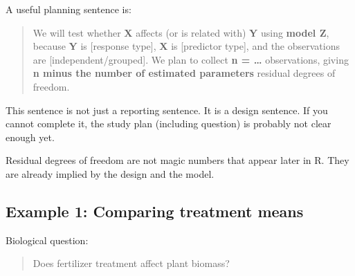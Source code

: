 \documentclass[
  letterpaper,
  8pt,
  a4paper]{book}
\begin{document}
A useful planning sentence is:

\begin{quote}
We will test whether \textbf{X} affects (or is related with) \textbf{Y}
using \textbf{model Z}, because \textbf{Y} is {[}response type{]},
\textbf{X} is {[}predictor type{]}, and the observations are
{[}independent/grouped{]}. We plan to collect \textbf{n = \ldots{}}
observations, giving \textbf{n minus the number of estimated parameters}
residual degrees of freedom.
\end{quote}

This sentence is not just a reporting sentence. It is a design sentence.
If you cannot complete it, the study plan (including question) is
probably not clear enough yet.

\begin{tcolorbox}[enhanced jigsaw, arc=.35mm, bottomrule=.15mm, bottomtitle=1mm, breakable, colback=white, colbacktitle=quarto-callout-note-color!10!white, colframe=quarto-callout-note-color-frame, coltitle=black, left=2mm, leftrule=.75mm, opacityback=0, opacitybacktitle=0.6, rightrule=.15mm, title=\textcolor{quarto-callout-note-color}{\faInfo}\hspace{0.5em}{Note}, titlerule=0mm, toprule=.15mm, toptitle=1mm]

Residual degrees of freedom are not magic numbers that appear later in
R. They are already implied by the design and the model.

\end{tcolorbox}

\subsection*{Example 1: Comparing treatment
means}\label{example-1-comparing-treatment-means}

Biological question:

\begin{quote}
Does fertilizer treatment affect plant biomass?
\end{quote}
\end{document}
